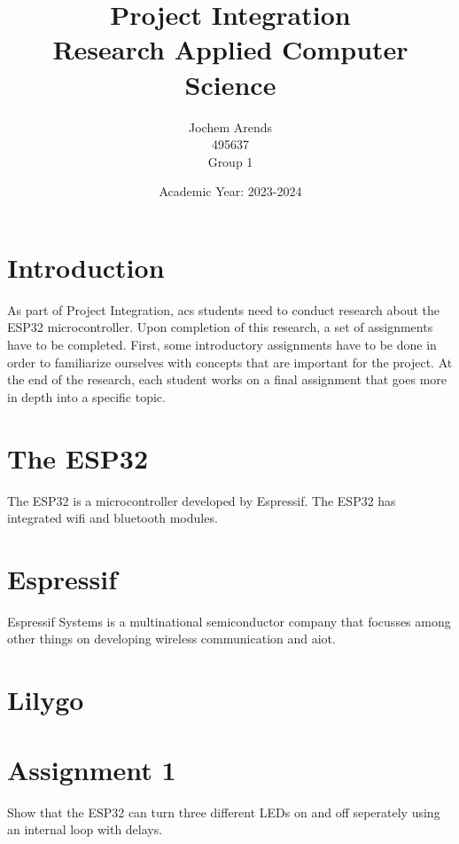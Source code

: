 \documentclass{article}
\title{Project Integration \\ Research Applied Computer Science}
\author{Jochem Arends \\ 495637 \\ Group 1}
\date{Academic Year: 2023-2024}
\begin{document}
\maketitle
\newpage

\tableofcontents
\clearpage

\printglossary[type=\acronymtype,{title=Abbreviations}]
\printglossary[type=main]


\clearpage

\section{Introduction}
As part of Project Integration, \gls{acs} students need to conduct research about the ESP32 microcontroller.
Upon completion of this research, a set of assignments have to be completed.
First, some introductory assignments have to be done in order to familiarize ourselves with concepts that are important for the project.
At the end of the research, each student works on a final assignment that goes more in depth into a specific topic.

\section{The ESP32}
The ESP32 is a microcontroller developed by Espressif.
The ESP32 has integrated \gls{wifi} and \gls{bluetooth} modules.

\section{Espressif}
Espressif Systems is a multinational semiconductor company that focusses among other things on developing wireless communication and \gls{aiot}.
\cite{aboutespressif}

\section {Lilygo}


\section{Assignment 1}
Show that the ESP32 can turn three different LEDs on and off seperately using an internal loop with delays.\\

\inputminted{cpp}{../leds/main/leds.cpp}
\end{document}

